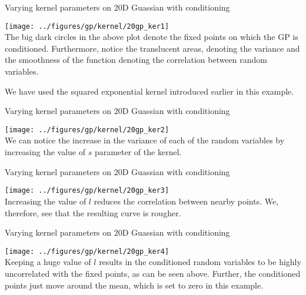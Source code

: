 \documentclass{beamer}
\begin{document}
	\begin{frame}{Varying kernel parameters on 20D Guassian with conditioning}
		\begin{center}
			\texttt{[image: ../figures/gp/kernel/20gp\_ker1]}\\
			The big dark circles in the above plot denote the fixed points on which the GP is conditioned. Furthermore, notice the translucent areas, denoting the variance and the smoothness of the function denoting the correlation between random variables.
			
			We have used the squared exponential kernel introduced earlier in this example.
		\end{center}
	\end{frame}
	
	\begin{frame}{Varying kernel parameters on 20D Guassian with conditioning}
		\begin{center}
			\texttt{[image: ../figures/gp/kernel/20gp\_ker2]}\\
			We can notice the increase in the variance of each of the random variables by increasing the value of $s$ parameter of the kernel.
		\end{center}
	\end{frame}
	
	\begin{frame}{Varying kernel parameters on 20D Guassian with conditioning}
		\begin{center}
			\texttt{[image: ../figures/gp/kernel/20gp\_ker3]}\\
			Increasing the value of $l$ reduces the correlation between nearby points. We, therefore, see that the resulting curve is rougher.
		\end{center}
	\end{frame}
	
	\begin{frame}{Varying kernel parameters on 20D Guassian with conditioning}
		\begin{center}
			\texttt{[image: ../figures/gp/kernel/20gp\_ker4]}\\
			Keeping a huge value of $l$ results in the conditioned random variables to be highly uncorrelated with the fixed points, as can be seen above. Further, the conditioned points just move around the mean, which is set to zero in this example.
		\end{center}
	\end{frame}
	
\end{document}
